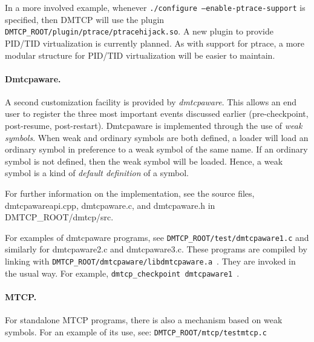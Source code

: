 \documentclass{article}
\begin{document}
In a more involved example, whenever {\tt ./configure
--enable-ptrace-support} is specified, then DMTCP will use the plugin
{\tt DMTCP\_ROOT/plugin/ptrace/ptracehijack.so}.  A new plugin to
provide PID/TID virtualization is currently planned.  As with support
for ptrace, a more modular structure for PID/TID virtualization will be
easier to maintain.

\paragraph{Dmtcpaware.}

A second customization facility is provided by {\em dmtcpaware}.
This allows an end user to register the three most important events
discussed earlier (pre-checkpoint, post-resume, post-restart).
Dmtcpaware is implemented through the use of {\em weak symbols}.
When weak and ordinary symbols are both defined, a loader will
load an ordinary symbol in preference to a weak symbol of the same name.
If an ordinary symbol is not defined, then the weak symbol will
be loaded.  Hence, a weak symbol is a kind of {\em default definition}
of a symbol.

For further information on the implementation, see the source files,
dmtcpawareapi.cpp, dmtcpaware.c, and dmtcpaware.h in DMTCP\_ROOT/dmtcp/src.

For examples of dmtcpaware programs, see
 {\tt DMTCP\_ROOT/test/dmtcpaware1.c} and similarly for dmtcpaware2.c and
dmtcpaware3.c.  These programs are compiled by linking with\hfil\break
{\tt DMTCP\_ROOT/dmtcpaware/libdmtcpaware.a}~.
They are invoked in the usual way.  For example, \newline
{\tt dmtcp\_checkpoint dmtcpaware1}~.


\paragraph{MTCP.}

For standalone MTCP programs, there is also a mechanism based on
weak symbols.  For an example of its use, see:
{\tt DMTCP\_ROOT/mtcp/testmtcp.c}
\end{document}
